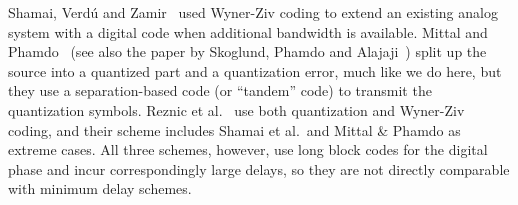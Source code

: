 Shamai, Verd\'u and Zamir~\cite{ShamaiVZ1998} used Wyner-Ziv coding to extend an
existing analog system with a digital code when additional bandwidth is
available. Mittal and Phamdo~\cite{MittalP2002} (see also the paper by Skoglund,
Phamdo and Alajaji~\cite{SkoglundPA2002}) split up the source into a quantized
part and a quantization error, much like we do here, but they use a
separation-based code (or ``tandem'' code) to transmit the quantization symbols.
Reznic et al.~\cite{ReznicFZ2006} use both quantization and Wyner-Ziv coding,
and their scheme includes Shamai et al.\ and Mittal \& Phamdo as extreme cases.
All three schemes, however, use long block codes for the digital phase and incur
correspondingly large delays, so they are not directly comparable with minimum
delay schemes.














